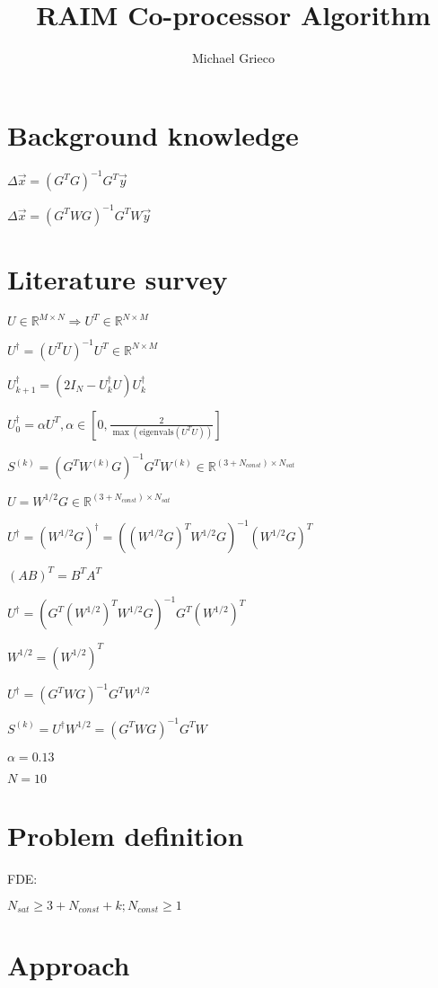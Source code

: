 \documentclass[11pt]{article}
\title{RAIM Co-processor Algorithm}
\author{Michael Grieco}
\date{}
\begin{document}
\section{Background knowledge}

$\Delta \vec{x} = (G^T G)^{-1} G^T \vec{y}$

$\Delta \vec{x} = (G^T W G)^{-1} G^T W \vec{y}$

\section{Literature survey}

$U \in \mathbb{R}^{M \times N} \Rightarrow U^T \in \mathbb{R}^{N \times M}$

$U^{\dagger} = (U^T U)^{-1} U^T \in \mathbb{R}^{N \times M}$

$U^{\dagger}_{k+1}=(2I_N - U^{\dagger}_k U) U^{\dagger}_k$

$U^{\dagger}_0 = \alpha U^T, \alpha \in [0,\frac{2}{\max(\text{eigenvals}(U^T U))}]$

$S^{(k)} = (G^T W^{(k)} G)^{-1} G^T W^{(k)} \in \mathbb{R}^{(3+N_{const}) \times N_{sat}}$

$U = W^{1/2}G \in \mathbb{R}^{(3+N_{const}) \times N_{sat}}$

$U^{\dagger} = (W^{1/2}G)^{\dagger} = ((W^{1/2}G)^T W^{1/2}G)^{-1} (W^{1/2}G)^T$

$(AB)^T = B^T A^T$

$U^{\dagger} = (G^T (W^{1/2})^T W^{1/2}G)^{-1} G^T (W^{1/2})^T$

$W^{1/2} = (W^{1/2})^T$

$U^{\dagger} = (G^T W G)^{-1} G^T W^{1/2}$

$S^{(k)} = U^{\dagger} W^{1/2} = (G^T W G)^{-1} G^T W$

$\alpha = 0.13$

$N = 10$

\section{Problem definition}

FDE:

$N_{sat} \ge 3 + N_{const} + k; N_{const} \ge 1$

\section{Approach}
\end{document}
